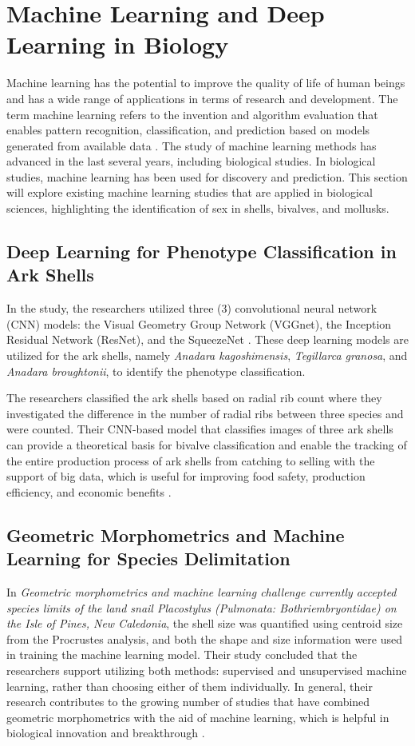 \section{Machine Learning and Deep Learning in Biology}
Machine learning has the potential to improve the quality of life of human beings and has a wide range of applications in terms of research and development. The term machine learning refers to the invention and algorithm evaluation that enables pattern recognition, classification, and prediction based on models generated from available data \cite{tarca2007}. The study of machine learning methods has advanced in the last several years, including biological studies. In biological studies, machine learning has been used for discovery and prediction. This section will explore existing machine learning studies that are applied in biological sciences, highlighting the identification of sex in shells, bivalves, and mollusks.

\subsection{Deep Learning for Phenotype Classification in Ark Shells}
In the study, the researchers utilized three (3) convolutional neural network (CNN) models: the Visual Geometry Group Network (VGGnet), the Inception Residual Network (ResNet), and the SqueezeNet \cite{kim2024}. These deep learning models are utilized for the ark shells, namely \textit{Anadara kagoshimensis}, \textit{Tegillarca granosa}, and \textit{Anadara broughtonii}, to identify the phenotype classification. 

The researchers classified the ark shells based on radial rib count where they investigated the difference in the number of radial ribs between three species and were counted. Their CNN-based model that classifies images of three ark shells can provide a theoretical basis for bivalve classification and enable the tracking of the entire production process of ark shells from catching to selling with the support of big data, which is useful for improving food safety, production efficiency, and economic benefits \cite{kim2024}.

\subsection{Geometric Morphometrics and Machine Learning for Species Delimitation}
In \textit{Geometric morphometrics and machine learning challenge currently accepted species limits of the land snail Placostylus (Pulmonata: Bothriembryontidae) on the Isle of Pines, New Caledonia}, the shell size was quantified using centroid size from the Procrustes analysis, and both the shape and size information were used in training the machine learning model. Their study concluded that the researchers support utilizing both methods: supervised and unsupervised machine learning, rather than choosing either of them individually. In general, their research contributes to the growing number of studies that have combined geometric morphometrics with the aid of machine learning, which is helpful in biological innovation and breakthrough \cite{quenu2020}.

